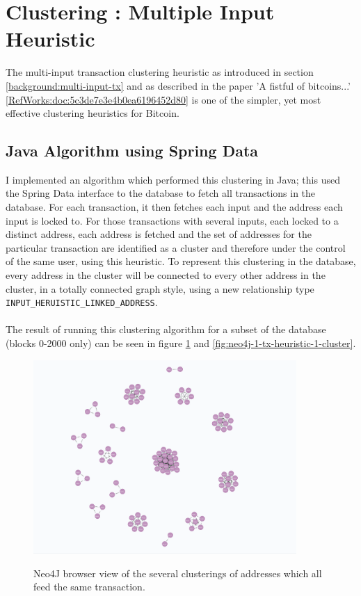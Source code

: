 \section{Clustering : Multiple Input Heuristic}\label{section-clustering}

The multi-input transaction clustering heuristic as introduced in section \ref{background:multi-input-tx} and as described in the paper 'A fistful of bitcoins...' \ref{RefWorks:doc:5c3de7e3e4b0ea6196452d80} is one of the simpler, yet most effective clustering heuristics for Bitcoin. 

\subsection{Java Algorithm using Spring Data}
I implemented an algorithm which performed this clustering in Java; this used the Spring Data interface to the database to fetch all transactions in the database. For each transaction, it then fetches each input and the address each input is locked to. For those transactions with several inputs, each locked to a distinct address, each address is fetched and the set of addresses for the particular transaction are identified as a cluster and therefore under the control of the same user, using this heuristic. To represent this clustering in the database, every address in the cluster will be connected to every other address in the cluster, in a totally connected graph style, using a new relationship type \texttt{INPUT\_HERUISTIC\_LINKED\_ADDRESS}. 
\\\\
The result of running this clustering algorithm for a subset of the database (blocks 0-2000 only) can be seen in figure \ref{fig:neo4j-many-heuristic-1-clusters} and \ref{fig:neo4j-1-tx-heuristic-1-cluster}. 

\begin{figure}[h!]
  \centering
  \includegraphics[width = 10cm]{./figures/many-clusters-heuristic-1}\\[0.5cm] 
  \caption{Neo4J browser view of the several clusterings of addresses which all feed the same transaction.}
  \label{fig:neo4j-many-heuristic-1-clusters}
\end{figure}

